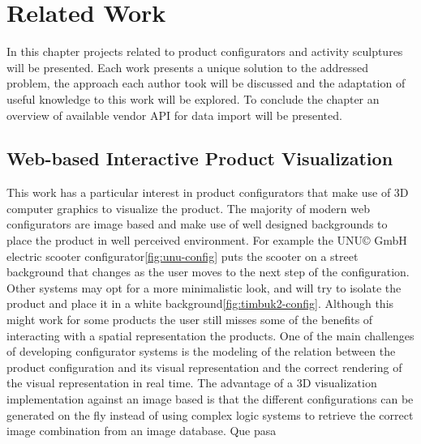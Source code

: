 \documentclass[Medieninformatik-arbeit.tex]{subfiles}
\begin{document}
\label{ch:related}
\section{Related Work}
In this chapter projects related to product configurators and activity
sculptures will be presented. Each work presents a unique solution to the addressed problem, 
the approach each author took will be discussed and the adaptation of useful knowledge to this
work will be explored. To conclude the chapter an overview of available vendor
API for data import will be presented. 

\subsection{Web-based Interactive Product Visualization}
This work has a particular interest in product configurators that make use of 3D
computer graphics to visualize the product. The majority of modern web
configurators are image based and make use of well designed backgrounds to place the
product in well perceived environment. For example the UNU\copyright{} GmbH electric scooter
configurator\ref{fig:unu-config} puts the scooter on a street background that
changes as the user moves to the next step of the configuration. Other
systems may opt for a more minimalistic look, and will try to isolate the product and place it
in a white background\ref{fig:timbuk2-config}. Although this
might work for some products the user still misses some of the benefits of
interacting with a spatial representation the products\cite{vande2009analyzing}.
One of the main challenges of developing  configurator systems is the modeling
of the relation between the product configuration and its visual representation
and the correct rendering of the visual representation in real
time\cite{feliceinteractive}. The advantage of a 3D visualization implementation
against an image based is that the different configurations can be generated on
the fly instead of using complex logic systems to retrieve the correct image
combination from an image database. Que pasa 
\end{document}

